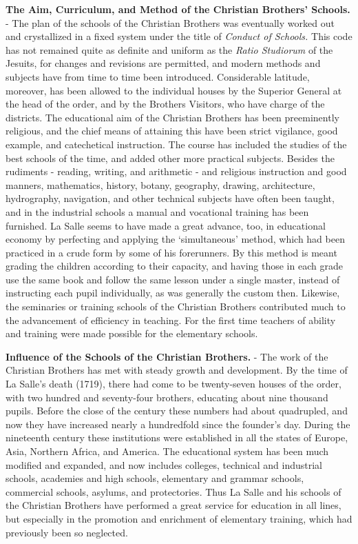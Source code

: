 \documentclass[
]{book}
\begin{document}
\textbf{The Aim, Curriculum, and Method of the Christian Brothers' Schools.} - The plan of the schools of the Christian Brothers was eventually worked out and crystallized in a fixed system under the title of \emph{Conduct of Schools.} This code has not remained quite as definite and uniform as the \emph{Ratio Studiorum} of the Jesuits, for changes and revisions are permitted, and modern methods and subjects have from time to time been introduced. Considerable latitude, moreover, has been allowed to the individual houses by the Superior General at the head of the order, and by the Brothers Visitors, who have charge of the districts. The educational aim of the Christian Brothers has been preeminently religious, and the chief means of attaining this have been strict vigilance, good example, and catechetical instruction. The course has included the studies of the best schools of the time, and added other more practical subjects. Besides the rudiments - reading, writing, and arithmetic - and religious instruction and good manners, mathematics, history, botany, geography, drawing, architecture, hydrography, navigation, and other technical subjects have often been taught, and in the industrial schools a manual and vocational training has been furnished. La Salle seems to have made a great advance, too, in educational economy by perfecting and applying the `simultaneous' method, which had been practiced in a crude form by some of his forerunners. By this method is meant grading the children according to their capacity, and having those in each grade use the same book and follow the same lesson under a single master, instead of instructing each pupil individually, as was generally the custom then. Likewise, the seminaries or training schools of the Christian Brothers contributed much to the advancement of efficiency in teaching. For the first time teachers of ability and training were made possible for the elementary schools.

\textbf{Influence of the Schools of the Christian Brothers.} - The work of the Christian Brothers has met with steady growth and development. By the time of La Salle's death (1719), there had come to be twenty-seven houses of the order, with two hundred and seventy-four brothers, educating about nine thousand pupils. Before the close of the century these numbers had about quadrupled, and now they have increased nearly a hundredfold since the founder's day. During the nineteenth century these institutions were established in all the states of Europe, Asia, Northern Africa, and America. The educational system has been much modified and expanded, and now includes colleges, technical and industrial schools, academies and high schools, elementary and grammar schools, commercial schools, asylums, and protectories. Thus La Salle and his schools of the Christian Brothers have performed a great service for education in all lines, but especially in the promotion and enrichment of elementary training, which had previously been so neglected.
\end{document}
